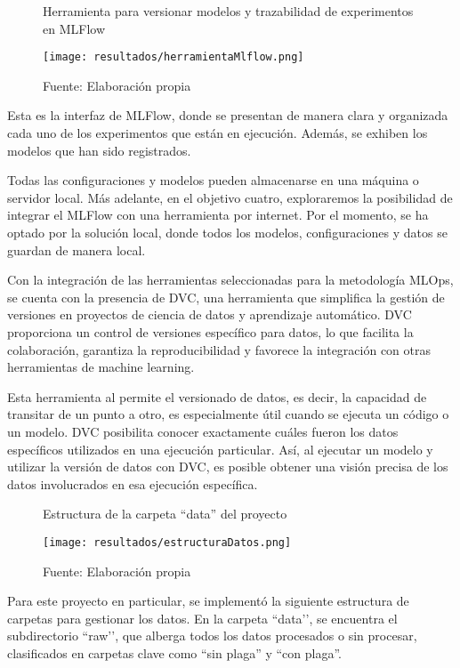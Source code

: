 \newpage

\begin{figure}[h]
\centering
\caption{Herramienta para versionar modelos y trazabilidad de experimentos en MLFlow}
\texttt{[image: resultados/herramientaMlflow.png]}
\caption*{\footnotesize Fuente: Elaboración propia}
\label{fig:figuraHerramientaMlflow}
\end{figure}

Esta es la interfaz de MLFlow, donde se presentan de manera clara y organizada cada uno de los experimentos que están en ejecución. Además, se exhiben los modelos que han sido registrados. \newline

Todas las configuraciones y modelos pueden almacenarse en una máquina o servidor local. Más adelante, en el objetivo cuatro, exploraremos la posibilidad de integrar el MLFlow con una herramienta por internet. Por el momento, se ha optado por la solución local, donde todos los modelos, configuraciones y datos se guardan de manera local. \newline

Con la integración de las herramientas seleccionadas para la metodología MLOps, se cuenta con la presencia de DVC, una herramienta que simplifica la gestión de versiones en proyectos de ciencia de datos y aprendizaje automático. DVC proporciona un control de versiones específico para datos, lo que facilita la colaboración, garantiza la reproducibilidad y favorece la integración con otras herramientas de machine learning.

\newpage

Esta herramienta al permite el versionado de datos, es decir, la capacidad de transitar de un punto a otro, es especialmente útil cuando se ejecuta un código o un modelo. DVC posibilita conocer exactamente cuáles fueron los datos específicos utilizados en una ejecución particular. Así, al ejecutar un modelo y utilizar la versión de datos con DVC, es posible obtener una visión precisa de los datos involucrados en esa ejecución específica.

\begin{figure}[h]
\centering
\caption{Estructura de la carpeta ``data'' del proyecto}
\texttt{[image: resultados/estructuraDatos.png]}
\caption*{\footnotesize Fuente: Elaboración propia}
\label{fig:figuraEstructuraDatos}
\end{figure}

Para este proyecto en particular, se implementó la siguiente estructura de carpetas para gestionar los datos. En la carpeta ``data’’, se encuentra el subdirectorio ``raw’’, que alberga todos los datos procesados o sin procesar, clasificados en carpetas clave como ``sin plaga'' y ``con plaga''.

